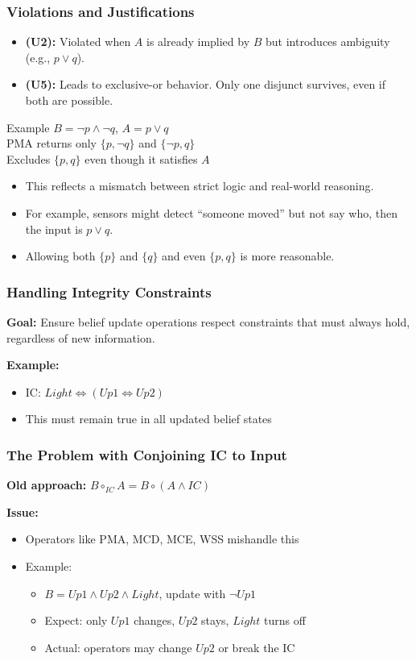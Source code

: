\documentclass{beamer}
\begin{document}
\begin{frame}
\frametitle{Violations and Justifications}
\begin{itemize}
    \item \textbf{(U2):} Violated when $A$ is already implied by $B$ but introduces ambiguity (e.g., $p \lor q$).
    \item \textbf{(U5):} Leads to exclusive-or behavior. Only one disjunct survives, even if both are possible.
\end{itemize}
\pause
\begin{block}{Example}
$B = \neg p \wedge \neg q$, $A = p \lor q$ \\
PMA returns only $\{p, \neg q\}$ and $\{\neg p, q\}$ \\
Excludes $\{p, q\}$ even though it satisfies $A$
\end{block}
\begin{itemize}
    \item This reflects a mismatch between strict logic and real-world reasoning.
    \item For example, sensors might detect “someone moved” but not say who, then the input is $p \lor q$.
    \item Allowing both $\{p\}$ and $\{q\}$ and even $\{p, q\}$ is more reasonable.
\end{itemize}
\end{frame}

\begin{frame}
\frametitle{Handling Integrity Constraints}
\textbf{Goal:} Ensure belief update operations respect constraints that must always hold, regardless of new information.

\textbf{Example:}
\begin{itemize}
\item IC: $Light \Leftrightarrow (Up1 \Leftrightarrow Up2)$
\item This must remain true in all updated belief states
\end{itemize}
\end{frame}

\begin{frame}
\frametitle{The Problem with Conjoining IC to Input}
\textbf{Old approach:} $B \circ_{IC} A = B \circ (A \land IC)$

\textbf{Issue:}
\begin{itemize}
\item Operators like PMA, MCD, MCE, WSS mishandle this
\item Example:
\begin{itemize}
\item $B = Up1 \land Up2 \land Light$, update with $\neg Up1$
\item Expect: only $Up1$ changes, $Up2$ stays, $Light$ turns off
\item Actual: operators may change $Up2$ or break the IC
\end{itemize}
\end{itemize}
\end{frame}
\end{document}
